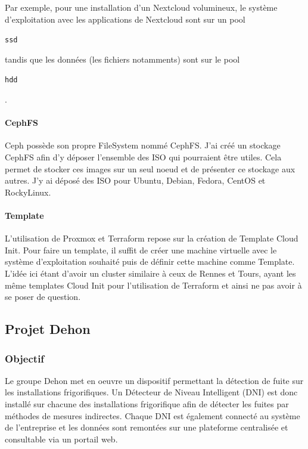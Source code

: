 \documentclass[12pt]{article}
\begin{document}
Par exemple, pour une installation d'un \gls{Nextcloud} volumineux, le système d'exploitation avec les applications de \gls{Nextcloud} sont sur un pool \begin{code}\texttt{ssd}\end{code} tandis que les données (les fichiers notamments) sont sur le pool \begin{code}\texttt{hdd}\end{code}.

\paragraph{CephFS}
\gls{Ceph} possède son propre FileSystem nommé CephFS.
J'ai créé un stockage CephFS afin d'y déposer l'ensemble des \gls{ISO} qui pourraient être utiles.
Cela permet de stocker ces images sur un seul noeud et de présenter ce stockage aux autres.
J'y ai déposé des \gls{ISO} pour Ubuntu, Debian, Fedora, CentOS et RockyLinux.

\paragraph{Template}
L'utilisation de \gls{Proxmox} et Terraform repose sur la création de Template Cloud Init.
Pour faire un template, il suffit de créer une machine virtuelle avec le système d'exploitation souhaité puis de définir cette machine comme Template.
L'idée ici étant d'avoir un \gls{cluster} similaire à ceux de Rennes et Tours, ayant les même templates Cloud Init pour l'utilisation de Terraform et ainsi ne pas avoir à se poser de question.

\newpage
\subsection{Projet Dehon} \label{dehon}
\subsubsection{Objectif}

Le groupe Dehon met en oeuvre un dispositif permettant la détection de fuite sur les installations frigorifiques. 
Un Détecteur de Niveau Intelligent (DNI) est donc installé sur chacune des installations frigorifique afin de détecter les fuites par méthodes de mesures indirectes.
Chaque DNI est également connecté au système de l'entreprise et les données sont remontées sur une plateforme centralisée et consultable via un portail web. 
\end{document}
